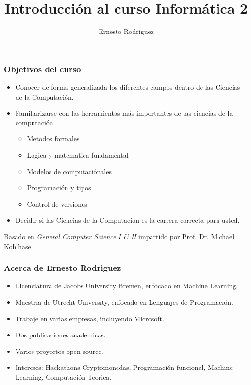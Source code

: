 \documentclass{beamer}
\title[Introducciòn]{Introducci\'on al curso Inform\'atica 2}
\author{Ernesto Rodriguez}
\institute{
    Universidad del Itsmo \\
    \medskip \textit{erodriguez@unis.edu.gt}
}
\date[\today]{}
\begin{document}
\begin{frame}
\titlepage
\end{frame}

\begin{frame}
    \frametitle{Objetivos del curso}
    \begin{itemize}
        \item{Conocer de forma generalizada los diferentes campos dentro de
        las Ciencias de la Computaci\'on.}
        \item{Familiarizarse con las herramientas m\'as importantes de
        las ciencias de la computaci\'on.
        \begin{itemize}
            \item{Metodos formales}
            \item{L\'ogica y matematica fundamental}
            \item{Modelos de computaci\'onales}
            \item{Programaci\'on y tipos}
            \item{Control de versiones}
        \end{itemize}
        }
        \item{Decidir si las Ciencias de la Computaci\'on es
        la carrera correcta para usted.}
    \end{itemize}

    \small{Basado en \emph{General Computer Science I \& II} impartido
    por \href{https://kwarc.info/people/mkohlhase/}{Prof. Dr. Michael Kohlhase}}

\end{frame}

\begin{frame}
\frametitle{Acerca de Ernesto Rodriguez}
\begin{itemize}
    \item{Licenciatura de Jacobs University Bremen,
    enfocado en Machine Learning.}
    \item{Maestria de Utrecht University, enfocado
    en Lenguajes de Programaci\'on.}
    \item{Trabaje en varias empresas, incluyendo Microsoft.}
    \item{Dos publicaciones academicas.}
    \item{Varios proyectos open source.}
    \item{Intereses: Hackathons Cryptomonedas, Programaci\'on funcional,
    Machine Learning, Computaci\'on Teorica.}
\end{itemize}
\end{frame}
\end{document}
